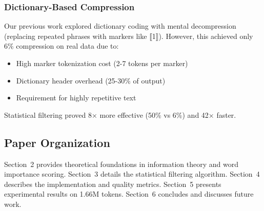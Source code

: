 \subsubsection{Dictionary-Based Compression}

Our previous work explored dictionary coding with mental decompression (replacing repeated phrases with markers like ⟦1⟧). However, this achieved only 6\% compression on real data due to:
\begin{itemize}
    \item High marker tokenization cost (2-7 tokens per marker)
    \item Dictionary header overhead (25-30\% of output)
    \item Requirement for highly repetitive text
\end{itemize}

Statistical filtering proved 8× more effective (50\% vs 6\%) and 42× faster.

\subsection{Paper Organization}

Section~2 provides theoretical foundations in information theory and word importance scoring. Section~3 details the statistical filtering algorithm. Section~4 describes the implementation and quality metrics. Section~5 presents experimental results on 1.66M tokens. Section~6 concludes and discusses future work.
